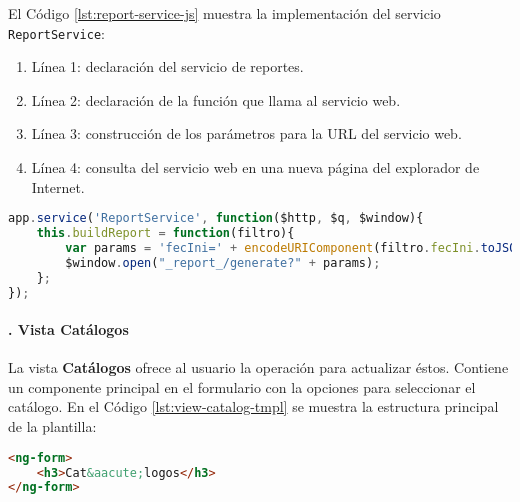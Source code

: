 El Código \ref{lst:report-service-js} muestra la implementación del servicio \texttt{ReportService}:
\begin{enumerate}
	\item Línea 1: declaración del servicio de reportes.
	\item Línea 2: declaración de la función que llama al servicio web.
	\item Línea 3: construcción de los parámetros para la URL del servicio web.
	\item Línea 4: consulta del servicio web en una nueva página del explorador de Internet.
\end{enumerate}
\begin{lstlisting}[language=Javascript, caption={Servicio en \textit{AngularJS} para pedir la generación de un reporte.}, captionpos=b, label={lst:report-service-js}]
app.service('ReportService', function($http, $q, $window){
	this.buildReport = function(filtro){
		var params = 'fecIni=' + encodeURIComponent(filtro.fecIni.toJSON()) + "&" + 'fecFin=' + encodeURIComponent(filtro.fecFin.toJSON()) + "&" + 'horIni=' + encodeURIComponent(filtro.horIni.toJSON()) + "&" + 'horFin=' + encodeURIComponent(filtro.horFin.toJSON()) + "&" + 'reporte=' + encodeURIComponent(filtro.reporte.key);
		$window.open("_report_/generate?" + params);
	};
});
\end{lstlisting}

\paragraph{. Vista Catálogos\\}
La vista \textbf{Catálogos} ofrece al usuario la operación para actualizar éstos. Contiene un componente principal en el formulario con la opciones para seleccionar el catálogo. En el Código \ref{lst:view-catalog-tmpl} se muestra la estructura principal de la plantilla:\\
\begin{lstlisting}[language=HTML, captionpos=b, caption={Plantilla de la vista que muestra los catálogos.}, label={lst:view-catalog-tmpl}]
<ng-form>
	<h3>Cat&aacute;logos</h3>
</ng-form>
\end{lstlisting}

